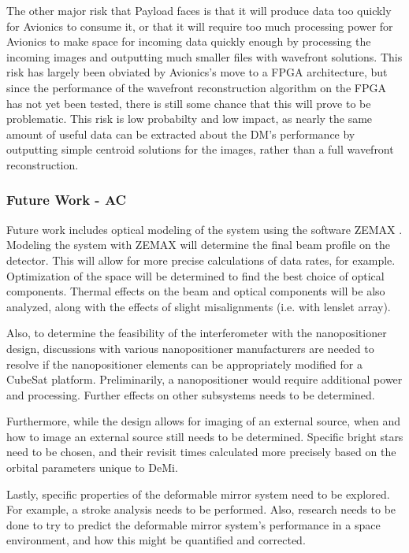 \documentclass[12pt]{article}
\begin{document}
The other major risk that Payload faces is that it will produce data too quickly for Avionics to consume it, or that it will require too much processing power for Avionics to make space for incoming data quickly enough by processing the incoming images and outputting much smaller files with wavefront solutions. This risk has largely been obviated by Avionics's move to a FPGA architecture, but since the performance of the wavefront reconstruction algorithm on the FPGA has not yet been tested, there is still some chance that this will prove to be problematic. This risk is low probabilty and low impact, as nearly the same amount of useful data can be extracted about the DM's performance by outputting simple centroid solutions for the images, rather than a full wavefront reconstruction. 

\subsubsection{Future Work - AC}

Future work includes optical modeling of the system using the software ZEMAX \cite{zemax}. Modeling the system with ZEMAX will determine the
  final beam profile on the detector.  This will allow for more precise calculations of data rates, for example.  Optimization of the space will
  be determined to find the best choice of optical components.  Thermal
  effects on the beam and optical components will be also analyzed, along with the effects of slight misalignments (i.e. with lenslet array).

Also, to determine the feasibility of the interferometer with the nanopositioner design, discussions with various nanopositioner manufacturers are needed to resolve if the nanopositioner elements can be appropriately modified for a CubeSat platform.  Preliminarily, a nanopositioner would require additional power and processing.  Further effects on other subsystems needs to be determined. 

Furthermore, while the design allows for imaging of an external source, when and how to image an external
  source still needs to be determined. Specific bright stars need to be chosen, and their revisit times calculated more precisely based on the orbital parameters unique to DeMi.

Lastly, specific properties of the deformable mirror system need to be explored.  For example, a stroke analysis needs to be performed.  Also, research needs to be done to try to predict the deformable mirror system's performance in a space environment, and how this might be quantified and corrected.
\end{document}
